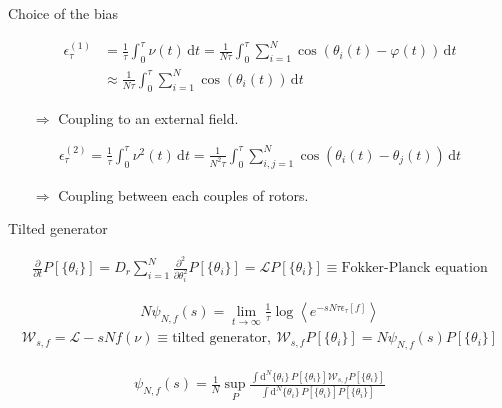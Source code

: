 \documentclass{beamer}
\begin{document}
\begin{frame}{Choice of the bias}

\begin{align*}
  \epsilon^{(1)}_{\tau} &= \frac{1}{\tau} \int_0^{\tau} \nu(t) \, \text{d}t = \frac{1}{N\tau} \int_0^{\tau} \sum_{i=1}^N \cos(\theta_i(t) - \varphi(t)) \, \text{d}t\\
  &\approx  \frac{1}{N\tau} \int_0^{\tau} \sum_{i=1}^N \cos(\theta_i(t)) \, \text{d}t
\end{align*}
\begin{itemize}
  \item[$\Rightarrow$] Coupling to an external field.
\end{itemize}

\pause
\return
\begin{align*}
  \epsilon^{(2)}_{\tau} = \frac{1}{\tau} \int_0^{\tau} \nu^2(t) \, \text{d}t = \frac{1}{N^2\tau} \int_0^{\tau} \sum_{i,j=1}^N \cos(\theta_i(t) - \theta_j(t)) \, \text{d}t
\end{align*}
\begin{itemize}
  \item[$\Rightarrow$] Coupling between each couples of rotors.
\end{itemize}


\end{frame}

\begin{frame}{Tilted generator}

\begin{align*}
\frac{\partial}{\partial t} P[\{\theta_i\}] = D_r \sum_{i=1}^N \frac{\partial^2}{\partial \theta_i^2} P[\{\theta_i\}] = \mathcal{L} P[\{\theta_i\}] \equiv \text{Fokker-Planck equation}
\end{align*}

\return
\begin{align*}
N \psi_{N,f}(s) = \lim_{t \rightarrow \infty} \frac{1}{\tau} \log\left<e^{- s N \tau \epsilon_{\tau}[f]}\right>
\end{align*}
\begin{align*}
\mathscr{W}_{s, f} = \mathcal{L} - s N f(\nu) \equiv \text{tilted generator},~ \mathscr{W}_{s, f} P[\{\theta_i\}] = N \psi_{N,f}(s) P[\{\theta_i\}]
\end{align*}

\return
\begin{align*}
\psi_{N, f}(s) = \frac{1}{N} \sup_{P} \frac{\int \text{d}^N\{\theta_i\} \, P[\{\theta_i\}] \mathscr{W}_{s, f} P[\{\theta_i\}]}{\int \text{d}^N\{\theta_i\} \, P[\{\theta_i\}] P[\{\theta_i\}]}
\end{align*}


\end{frame}
\end{document}
